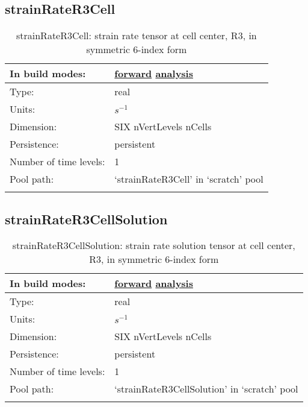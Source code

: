 \subsection[strainRateR3Cell]{strainRateR3Cell}
\label{subsec:var_sec_scratch_strainRateR3Cell}
\begin{center}
\begin{longtable}{| p{2.0in} | p{4.0in} |}
        \hline 
        In build modes: & \hyperref[subsec:forward_var_tab_scratch]{forward} \hyperref[subsec:analysis_var_tab_scratch]{analysis} \\
        \hline 
        Type: & real \\
        \hline 
        Units: & $s^{-1}$ \\
        \hline 
        Dimension: & SIX nVertLevels nCells \\
        \hline 
        Persistence: & persistent \\
        \hline 
        Number of time levels: & 1 \\
        \hline 
            Pool path: & `strainRateR3Cell' in `scratch' pool \\
		 \hline 
    \caption{strainRateR3Cell: strain rate tensor at cell center, R3, in symmetric 6-index form}
\end{longtable}
\end{center}
\subsection[strainRateR3CellSolution]{strainRateR3CellSolution}
\label{subsec:var_sec_scratch_strainRateR3CellSolution}
\begin{center}
\begin{longtable}{| p{2.0in} | p{4.0in} |}
        \hline 
        In build modes: & \hyperref[subsec:forward_var_tab_scratch]{forward} \hyperref[subsec:analysis_var_tab_scratch]{analysis} \\
        \hline 
        Type: & real \\
        \hline 
        Units: & $s^{-1}$ \\
        \hline 
        Dimension: & SIX nVertLevels nCells \\
        \hline 
        Persistence: & persistent \\
        \hline 
        Number of time levels: & 1 \\
        \hline 
            Pool path: & `strainRateR3CellSolution' in `scratch' pool \\
		 \hline 
    \caption{strainRateR3CellSolution: strain rate solution tensor at cell center, R3, in symmetric 6-index form}
\end{longtable}
\end{center}
